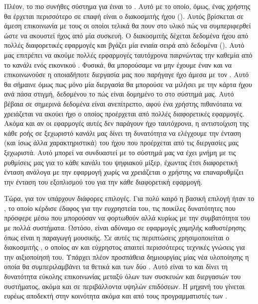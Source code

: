 \documentclass[12pt]{extarticle}
\begin{document}
Πλέον, το πιο συνήθες σύστημα για  έιναι το . \cite{ALSA} 
Αυτό με το οποίο, όμως, ένας χρήστης θα έρχεται περισσότερο σε επαφή
είναι ο διακοσμιτής ήχου (). Αυτός βρίσκεται σε άμεση
επικοινωνία με τους  οι οποίοι τελικά θα πουν στο υλικό πώς να
συμπεριφερθεί ώστε να ακουστεί ήχος από μία συσκευή. Ο διακοσμιτής δέχεται
δεδομένα ήχου από πολλές διαφορετικές εφαρμογές και βγάζει μία ενιαία σειρά από
δεδομένα (). Αυτό μας επιτρέπει να ακούμε πολλές ερφαρμογές ταυτόχρονα παιρνώντας
την καθεμία από το κανάλι ενός εικονικού . Φυσικά, θα μπορούσαμε να
μην έχουμε έναν  και να επικοινωνούσε η οποιαδήποτε διεργασία
μας που παρήγαγε ήχο άμεσα με τον . Αυτό θα σήμαινε όμως πως μόνο μία
διεργασία θα μπορούσε να μιλήσει με την κάρτα ήχου ανά πάσα στιγμή, δεδομένου
το πώς είναι δομημένο το  στο σύστημά μας. 
Αυτό βέβαια σε σημερινά δεδομένα είναι ανεπίτρεπτο, αφού ένα χρήστης πιθανότατα να χρειάζεται 
να ακούει ήχο ο οποίος προέρχεται από πολλές διαφορετικές εφαρμογές. Ακόμα και αν οι εφαρμογές 
αυτές δεν παράγουν ήχο ταυτόχρονα, η αντιστοίχιση της κάθε ροής σε ξεχωριστό κανάλι μας δίνει 
τη δυνατότητα να ελέγχουμε την ένταση (και ίσως άλλα χαρακτηριστικά) του ήχου που προέρχεται 
από τις διεργασίες μας ξεχωριστά. Αυτό μπορεί να συνδυαστεί με το σύστημά μας να έχει μνήμη 
με τις ρυθμίσεις μας για το κάθε κανάλι του ψηφιακού μίξερ, έχωντας έτσι διαφορετική 
ένταση ανάλογα με την εφαρμογή χωρίς να χρειάζεται ο χρήστης να επαναρυθμίζει την ένταση 
του εξοπλισμού του για την κάθε διαφορετική εφαρμογή.

Τώρα, για τον  υπάρχουν διάφορες επιλογές. Για πολύ καιρό η
βασική επιλογή ήταν το  \cite{PulseAudio}, το οποίο 
κέρδισε έδαφος για την ευχρηστεία του, τις ποικίλες δυνατότητες που πρόσφερε μέσω 
 που μπορούσαν να φορτωθούν αλλά κυρίως με την συμβατότητα του με πολλά συστήματα.
Ωστόσο, είναι
αδύναμο σε εφαρμογές χαμηλής καθυστέρησης όπως είναι η παραγωγή μουσικής. Σε
αυτές τις περιπτώσεις χρησιμοποιείται ο διακοσμιτής  \cite{JACK}, 
ο οποίος αν και εύχρηστος απαιτεί περισσότερες τεχνικές γνώσεις για την αιξιοποίησή του.
Υπάρχει πλέον προσπάθεια δημιουργίας μίας νέα υλοποίησης η οποία θα
συμπεριλαμβάνει τα θετικά και των δύο . Αυτό είναι το
 \cite{Pipewire} και δίνει τη δυνατότητα εύκολης επικοινωνίας
μεταξύ όλων των συσκευών και διεργασιών του συστήματος, ακόμα και σε
περιβάλλοντα υψηλών επιδόσεων. Η μηχανή του  γίνεται
ευρέως αποδεκτή στην κοινότητα ακόμα και από τους προγραμματιστές των
 . \cite{PipewireLWNArt}
\end{document}
